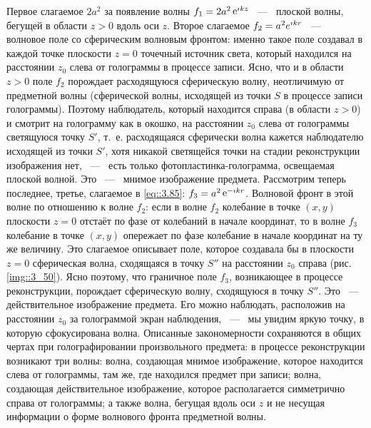 Первое слагаемое $2a^2$  за появление волны $f_1 = 2a^2\mathop{\mathrm e}\nolimits^{\imath kz}$
~---~ плоской волны, бегущей в области $z > 0$ вдоль оси $z$. Второе слагаемое $f_2 = a^2e^{\imath kr}$ 
~---~ волновое поле со сферическим волновым фронтом:
именно такое поле создавал в каждой точке плоскости $z = 0$ точечный
источник света, который находился на расстоянии $z_0$ слева от голограммы в процессе записи. 
Ясно, что и в области $z > 0$ поле $f_2$ порождает расходящуюся сферическую волну, неотличимую от предметной волны
(сферической волны, исходящей из точки $S$ в процессе записи голограммы). 
Поэтому наблюдатель, который находится справа (в области $z > 0$) и смотрит на голограмму как в окошко,  на расстоянии 
$z_0$ слева от голограммы светящуюся точку $S'$, т.~е. расходящаяся сферически волна кажется наблюдателю исходящей из точки
$S'$, хотя никакой светящейся точки на стадии реконструкции изображения нет, ~---~ есть только фотопластинка-голограмма, освещаемая плоской волной. 
Это ~---~ мнимое изображение предмета.
Рассмотрим теперь последнее, третье, слагаемое в \eqref{eq::3.85}:
$f_3 = a^2\mathop{\mathrm e}\nolimits^{-\imath kr}$. Волновой фронт в этой волне  по отношению к волне $f_2$:
если в волне $f_2$ колебание в точке $(x,y)$ плоскости $z = 0$ отстаёт по фазе от колебаний в начале координат, то в
волне $f_3$ колебание в точке $(x,y)$ опережает по фазе колебание в начале
координат на ту же величину. Это слагаемое описывает поле, которое
создавала бы в плоскости $z = 0$ сферическая волна, сходящаяся в
точку $S''$ на расстоянии $z_0$ справа (рис. \ref{img::3_50}). 
Ясно поэтому, что граничное поле $f_3$, возникающее в процессе реконструкции, порождает сферическую волну, сходящуюся в точку $S''$. 
Это ~---~ действительное изображение предмета.
Его можно наблюдать, расположив на расстоянии $z_0$ за голограммой экран наблюдения, ~---~ мы увидим яркую точку, в которую сфокусирована волна.
Описанные закономерности сохраняются в общих чертах при голографировании произвольного предмета: в процессе реконструкции возникают три волны: волна, создающая мнимое изображение, которое
находится слева от голограммы, там же, где находился предмет при записи; волна, создающая действительное изображение, которое располагается симметрично справа от голограммы; а также волна, бегущая
вдоль оси $z$ и не несущая информации о форме волнового фронта предметной волны.
